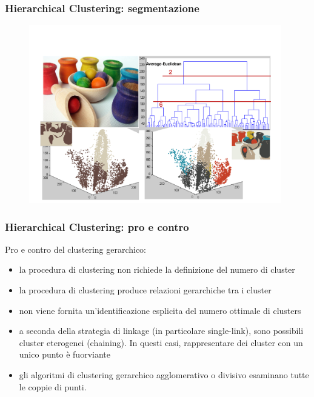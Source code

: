 \begin{frame}

	\frametitle{{\color{GradientDescentDiagramGreen}Hierarchical Clustering}: segmentazione}

		\begin{figure}[!htbp]
			\centering
			\includegraphics[width=11.0cm]{images/unsupervised/hierarchical/hc_avg_euclidean_2.pdf}
		\end{figure}


\end{frame}


\begin{frame}

	\frametitle{{\color{GradientDescentDiagramGreen}Hierarchical Clustering}: pro e contro}

		Pro e contro del clustering gerarchico:
		\begin{itemize}
			\item la procedura di clustering non richiede la definizione del numero di cluster
			\item la procedura di clustering produce relazioni gerarchiche tra i cluster
			\item non viene fornita un'identificazione esplicita del numero ottimale di clusters
			\item a seconda della strategia di linkage (in particolare single-link), sono possibili cluster eterogenei (chaining). In questi casi, rappresentare dei cluster con un unico punto è fuorviante
			\item gli algoritmi di clustering gerarchico agglomerativo o divisivo esaminano tutte le coppie di punti.
		\end{itemize}

\end{frame}
